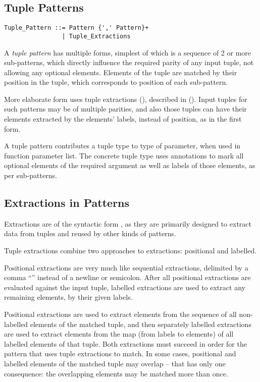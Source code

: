 \subsection{Tuple Patterns}
\label{sec:tuple-patterns}

\grammar\begin{lstlisting}
Tuple_Pattern ::= Pattern {',' Pattern}+
                | Tuple_Extractions
\end{lstlisting}

A {\em tuple pattern} has multiple forms, simplest of which is a sequence of 2 or more sub-patterns, which directly influence the required parity of any input tuple, not allowing any optional elements. Elements of the tuple are matched by their position in the tuple, which corresponds to position of each sub-pattern. 

More elaborate form uses tuple extractions (), described in (). Input tuples for such patterns may be of multiple parities, and also those tuples can have their elements extracted by the elements' labels, instead of position, as in the first form. 

A tuple pattern contributes a tuple type to type of parameter, when used in function parameter list. The concrete tuple type uses annotations to mark all optional elements of the required argument as well as labels of those elements, as per sub-patterns. 





\subsection{Extractions in Patterns}
\label{sec:extractions-in-patterns}

Extractions are of the syntactic form , as they are primarily designed to extract data from tuples and reused by other kinds of patterns. 

Tuple extractions combine two approaches to extractions: positional and labelled. 

Positional extractions are very much like sequential extractions, delimited by a comma ``\code{,}'' instead of a newline or semicolon. After all positional extractions are evaluated against the input tuple, labelled extractions are used to extract any remaining elements, by their given labels. 

Positional extractions are used to extract elements from the sequence of all non-labelled elements of the matched tuple, and then separately labelled extractions are used to extract elements from the map (from labels to elements) of all labelled elements of that tuple. Both extractions must succeed in order for the pattern that uses tuple extractions to match. In some cases, positional and labelled elements of the matched tuple may overlap -- that has only one consequence: the overlapping elements may be matched more than once. 

